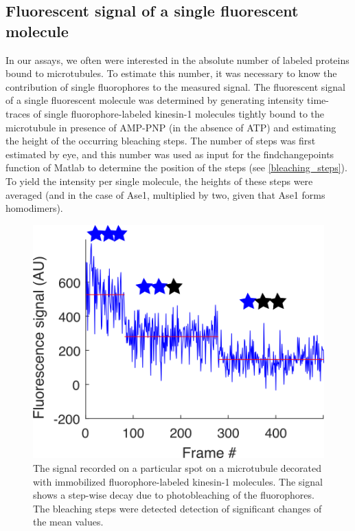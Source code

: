\subsection{Fluorescent signal of a single fluorescent molecule} 
In our assays, we often were interested in the absolute number of labeled proteins bound to microtubules. To estimate this number, it was necessary to know the contribution of single fluorophores to the measured signal. The fluorescent signal of a single fluorescent molecule was determined by generating intensity time-traces of single fluorophore-labeled kinesin-1 molecules tightly bound to the microtubule in presence of AMP-PNP (in the absence of ATP) and estimating the height of the occurring bleaching steps. The number of steps was first estimated by eye, and this number was used as input for the findchangepoints function of Matlab to determine the position of the steps (see \autoref{bleaching_steps}). To yield the intensity per single molecule, the heights of these steps were averaged (and in the case of Ase1, multiplied by two, given that Ase1 forms homodimers).
\begin{figure}[htb]
\centering
\includegraphics[scale=1.1]{Figures/bleaching_steps.png}
\caption[An illustration explaining our estimation of the fluorescent signal of a single fluorophore.]{
		The signal recorded on a particular spot on a microtubule decorated with immobilized fluorophore-labeled kinesin-1 molecules. The signal shows a step-wise decay due to photobleaching of the fluorophores. The bleaching steps were detected detection of significant changes of the mean values.
	}\label{bleaching_steps}
\end{figure}

